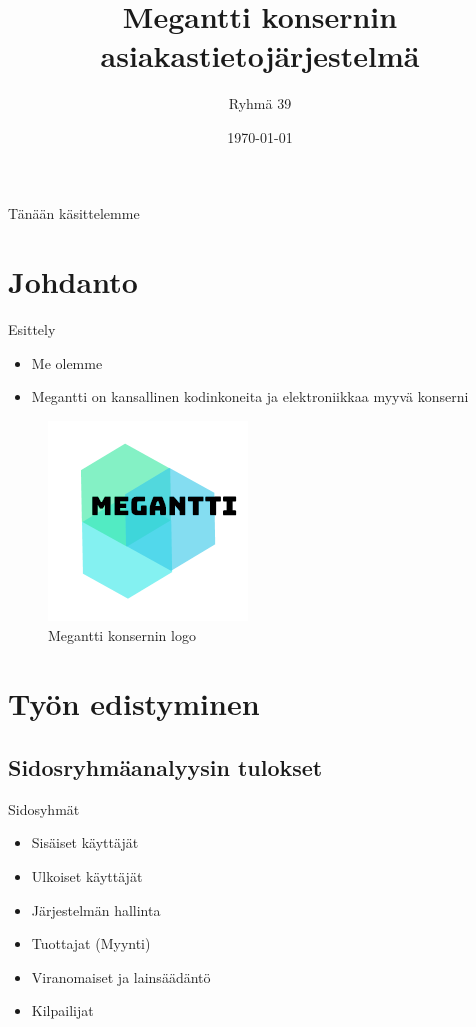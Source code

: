 \documentclass{beamer}
\title[JOTU-2019 Megantti]{Megantti konsernin asiakastietojärjestelmä}
\author{Ryhmä 39}
\institute{Tampereen Teknillinen Yliopisto}
\date{\today}
\begin{document}
\begin{frame}
  \titlepage
\end{frame}

\begin{frame}{Tänään käsittelemme}
	\tableofcontents[pausesections]
\end{frame}

\section{Johdanto}

\begin{frame}{Esittely}
\begin{itemize}
  \item<1-> Me olemme
  \item<2-> Megantti on kansallinen kodinkoneita ja elektroniikkaa myyvä konserni
\end{itemize}

\begin{figure}
\includegraphics[scale=1.0]{../megantti.png}
	\caption{Megantti konsernin logo}
\end{figure}

\end{frame}

\section{Työn edistyminen}


\subsection{Sidosryhmäanalyysin tulokset}

\begin{frame}{Sidosyhmät}
\begin{itemize}
	\item Sisäiset käyttäjät
	\item Ulkoiset käyttäjät
	\item Järjestelmän hallinta
	\item Tuottajat (Myynti)
	\item Viranomaiset ja lainsäädäntö
	\item Kilpailijat
\end{itemize}
\end{frame}
\end{document}
